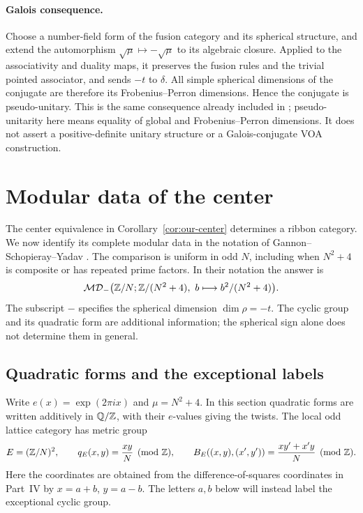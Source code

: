 \documentclass[11pt,a4paper]{article}
\numberwithin{equation}{section}
\theoremstyle{definition}\newtheorem{definition}[theorem]{Definition}
\theoremstyle{remark}\newtheorem{remark}[theorem]{Remark}
\begin{document}
\paragraph{Galois consequence.}
Choose a number-field form of the fusion category and its spherical
structure, and extend the automorphism
$\sqrt\mu\mapsto-\sqrt\mu$ to its algebraic closure. Applied to the
associativity and duality maps, it preserves the fusion rules and
the trivial pointed associator, and sends $-t$ to $\delta$.
All simple spherical dimensions of the conjugate are therefore
its Frobenius--Perron dimensions. Hence the conjugate is
pseudo-unitary. This is the same consequence already included in
\cite[Theorem A(1) and Section 1.3]{gsy}; pseudo-unitarity here means
equality of global and Frobenius--Perron dimensions. It does not
assert a positive-definite unitary structure or a Galois-conjugate
VOA construction.

\section{Modular data of the center}
\label{sec:gsy-modular}

The center equivalence in Corollary~\ref{cor:our-center} determines
a ribbon category. We now identify its complete modular data in the
notation of Gannon--Schopieray--Yadav \cite[Section 5 and Appendix F.1]{gsy}.
The comparison is uniform in odd $N$, including when $N^2+4$ is
composite or has repeated prime factors. In their notation the answer is
\[
 \mathcal{MD}_{-}\bigl(\Z/N;\Z/(N^2+4),\ b\longmapsto b^2/(N^2+4)\bigr).
\]
The subscript $-$ specifies the spherical dimension $\dim\rho=-t$.
The cyclic group and its quadratic form are additional information;
the spherical sign alone does not determine them in general.

\subsection{Quadratic forms and the exceptional labels}

Write $e(x)=\exp(2\pi ix)$ and $\mu=N^2+4$. In this section
quadratic forms are written additively in $\mathbb Q/\mathbb Z$, with their
$e$-values giving the twists. The local odd lattice category has metric group
\[
 E=(\mathbb Z/N)^2,\qquad q_E(x,y)=\frac{xy}{N}\pmod{\mathbb Z},
 \qquad B_E((x,y),(x',y'))=\frac{xy'+x'y}{N}\pmod{\mathbb Z}.
\]
Here the coordinates are obtained from the difference-of-squares
coordinates in Part~IV by $x=a+b$, $y=a-b$. The letters $a,b$
below will instead label the exceptional cyclic group.
\end{document}
